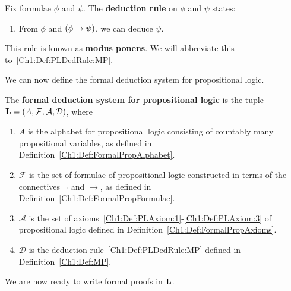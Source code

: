 \begin{boxdefinition}\label{Ch1:Def:MP}
    Fix formulae $\phi$ and $\psi$. The \textbf{deduction rule} on $\phi$ and $\psi$ states:
    \begin{enumerate}[label = (MP)]
        \item\label{Ch1:Def:PLDedRule:MP}
        \begin{center}
            From $\phi$ and $\left( \phi \to \psi \right)$, we can deduce $\psi$.
        \end{center}
    \end{enumerate}
    This rule is known as \textbf{modus ponens}. We will abbreviate this to~\ref{Ch1:Def:PLDedRule:MP}.
\end{boxdefinition}

We can now define the formal deduction system for propositional logic.

\begin{boxdefinition}
    The \textbf{formal deduction system for propositional logic} is the tuple $\mathbf{L} = \left( A, \mathcal{F}, \mathcal{A}, \mathcal{D} \right)$, where
    \begin{enumerate}
        \item $A$ is the alphabet for propositional logic consisting of countably many propositional variables, as defined in Definition~\ref{Ch1:Def:FormalPropAlphabet}.

        \item $\mathcal{F}$ is the set of formulae of propositional logic constructed in terms of the connectives $\neg$ and $\to$, as defined in Definition~\ref{Ch1:Def:FormalPropFormulae}.
        
        \item $\mathcal{A}$ is the set of axioms~\ref{Ch1:Def:PLAxiom:1}-\ref{Ch1:Def:PLAxiom:3} of propositional logic defined in Definition~\ref{Ch1:Def:FormalPropAxioms}.
        
        \item $\mathcal{D}$ is the deduction rule~\ref{Ch1:Def:PLDedRule:MP} defined in Definition~\ref{Ch1:Def:MP}.
    \end{enumerate}
\end{boxdefinition}

We are now ready to write formal proofs in $\mathbf{L}$.

